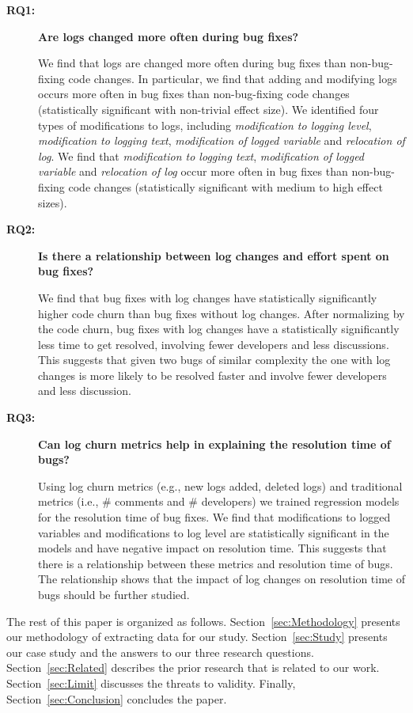 \begin{description}
\item[\textbf{RQ1:}]\textbf{Are logs changed more often during bug fixes?} 

We find that logs are changed more often during bug fixes than non-bug-fixing code changes. In particular, we find that adding and modifying logs occurs more often in bug fixes than non-bug-fixing code changes (statistically significant with non-trivial effect size). We identified four types of modifications to logs, including \emph{modification to logging level}, \emph{modification to logging text}, \emph{modification of logged variable} and \emph{relocation of log}. We find that \emph{modification to logging text}, \emph{modification of logged variable} and \emph{relocation of log} occur more often in bug fixes than non-bug-fixing code changes (statistically significant with medium to high effect sizes). 



\item[\textbf{RQ2:}]\textbf{Is there a relationship between log changes and effort spent on bug fixes?}

We find that bug fixes with log changes have statistically significantly higher code churn than bug fixes without log changes. After normalizing by the code churn, bug fixes with log changes have a statistically significantly less time to get resolved, involving fewer developers and less discussions. This suggests that given two bugs of similar complexity the one with log changes is more likely to be resolved faster and involve fewer developers and less discussion. 

\item[\textbf{RQ3:}]\textbf{Can log churn metrics help in explaining the resolution time of bugs?}

Using log churn metrics (e.g., new logs added, deleted logs) and traditional metrics (i.e., \# comments and \# developers) we trained regression models for the resolution time of bug fixes. We find that modifications to logged variables and modifications to log level are statistically significant in the models and have negative impact on resolution time. This suggests that there is a relationship between these metrics and resolution time of bugs. The relationship shows that the impact of log changes on resolution time of bugs should be further studied. 

\end{description}


The rest of this paper is organized as follows. Section~\ref{sec:Methodology} presents our methodology of extracting data for our study. Section~\ref{sec:Study} presents our case study and the answers to our three research questions. Section~\ref{sec:Related} describes the prior research that is related to our work. Section~\ref{sec:Limit} discusses the threats to validity. Finally, Section~\ref{sec:Conclusion} concludes the paper.


